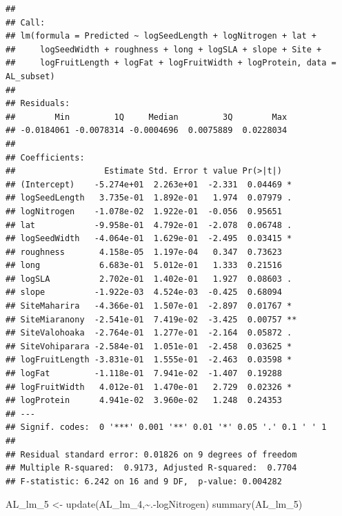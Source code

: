 \documentclass[
  12pt,
]{article}
\newenvironment{Shaded}{\begin{snugshade}}{\end{snugshade}}
\newcommand{\FunctionTok}[1]{\textcolor[rgb]{0.00,0.00,0.00}{#1}}
\newcommand{\NormalTok}[1]{#1}
\newcommand{\OtherTok}[1]{\textcolor[rgb]{0.56,0.35,0.01}{#1}}
\newcommand{\SpecialCharTok}[1]{\textcolor[rgb]{0.00,0.00,0.00}{#1}}
\begin{document}
\begin{verbatim}
## 
## Call:
## lm(formula = Predicted ~ logSeedLength + logNitrogen + lat + 
##     logSeedWidth + roughness + long + logSLA + slope + Site + 
##     logFruitLength + logFat + logFruitWidth + logProtein, data = AL_subset)
## 
## Residuals:
##        Min         1Q     Median         3Q        Max 
## -0.0184061 -0.0078314 -0.0004696  0.0075889  0.0228034 
## 
## Coefficients:
##                  Estimate Std. Error t value Pr(>|t|)   
## (Intercept)    -5.274e+01  2.263e+01  -2.331  0.04469 * 
## logSeedLength   3.735e-01  1.892e-01   1.974  0.07979 . 
## logNitrogen    -1.078e-02  1.922e-01  -0.056  0.95651   
## lat            -9.958e-01  4.792e-01  -2.078  0.06748 . 
## logSeedWidth   -4.064e-01  1.629e-01  -2.495  0.03415 * 
## roughness       4.158e-05  1.197e-04   0.347  0.73623   
## long            6.683e-01  5.012e-01   1.333  0.21516   
## logSLA          2.702e-01  1.402e-01   1.927  0.08603 . 
## slope          -1.922e-03  4.524e-03  -0.425  0.68094   
## SiteMaharira   -4.366e-01  1.507e-01  -2.897  0.01767 * 
## SiteMiaranony  -2.541e-01  7.419e-02  -3.425  0.00757 **
## SiteValohoaka  -2.764e-01  1.277e-01  -2.164  0.05872 . 
## SiteVohiparara -2.584e-01  1.051e-01  -2.458  0.03625 * 
## logFruitLength -3.831e-01  1.555e-01  -2.463  0.03598 * 
## logFat         -1.118e-01  7.941e-02  -1.407  0.19288   
## logFruitWidth   4.012e-01  1.470e-01   2.729  0.02326 * 
## logProtein      4.941e-02  3.960e-02   1.248  0.24353   
## ---
## Signif. codes:  0 '***' 0.001 '**' 0.01 '*' 0.05 '.' 0.1 ' ' 1
## 
## Residual standard error: 0.01826 on 9 degrees of freedom
## Multiple R-squared:  0.9173, Adjusted R-squared:  0.7704 
## F-statistic: 6.242 on 16 and 9 DF,  p-value: 0.004282
\end{verbatim}

\begin{Shaded}
\begin{Highlighting}[]
\NormalTok{AL\_lm\_5 }\OtherTok{\textless{}{-}} \FunctionTok{update}\NormalTok{(AL\_lm\_4,}\SpecialCharTok{\textasciitilde{}}\NormalTok{.}\SpecialCharTok{{-}}\NormalTok{logNitrogen)}
\FunctionTok{summary}\NormalTok{(AL\_lm\_5)}
\end{Highlighting}
\end{Shaded}
\end{document}
